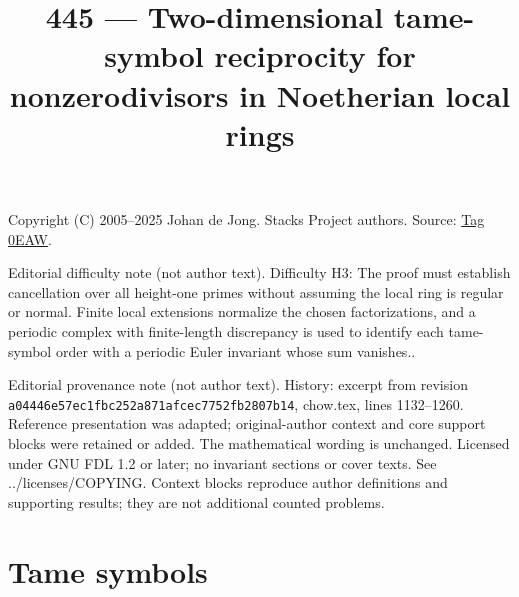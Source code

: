 \documentclass{amsart}
\theoremstyle{plain}
\theoremstyle{definition}
\theoremstyle{remark}
\numberwithin{equation}{subsection}
\begin{document}
\title[Stacks Project, Tag 0EAW]{445 --- Two-dimensional tame-symbol reciprocity for nonzerodivisors in Noetherian local rings}
\maketitle
\noindent Copyright (C) 2005--2025 Johan de Jong. Stacks Project authors. Source: \href{https://stacks.math.columbia.edu/tag/0EAW}{Tag 0EAW}.

\noindent Editorial difficulty note (not author text). Difficulty H3: The proof must establish cancellation over all height-one primes without assuming the local ring is regular or normal. Finite local extensions normalize the chosen factorizations, and a periodic complex with finite-length discrepancy is used to identify each tame-symbol order with a periodic Euler invariant whose sum vanishes..

\noindent Editorial provenance note (not author text). History: excerpt from revision \texttt{a0444\allowbreak 6e57e\allowbreak c1fbc\allowbreak 252a8\allowbreak 71afc\allowbreak ec775\allowbreak 2fb28\allowbreak 07b14}, chow.tex, lines 1132--1260. Reference presentation was adapted; original-author context and core support blocks were retained or added. The mathematical wording is unchanged. Licensed under GNU FDL 1.2 or later; no invariant sections or cover texts. See ../licenses/COPYING. Context blocks reproduce author definitions and supporting results; they are not additional counted problems.

\section{Tame symbols}
\label{section-tame-symbol}
\end{document}
